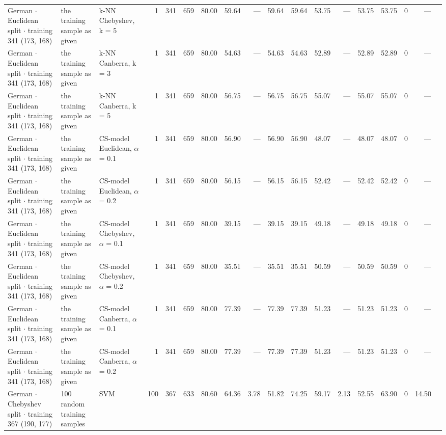 \begin{longtable}{lllrrrrrrrrrrrrrrl}
  German $\cdot$ Euclidean split $\cdot$ training 341 (173, 168) & the training sample as given & k-NN Chebyshev, k = 5 & 1 & 341 & 659 & 80.00 & 59.64 & --- & 59.64 & 59.64 & 53.75 & --- & 53.75 & 53.75 & 0 & --- &  \\
  German $\cdot$ Euclidean split $\cdot$ training 341 (173, 168) & the training sample as given & k-NN Canberra, k = 3 & 1 & 341 & 659 & 80.00 & 54.63 & --- & 54.63 & 54.63 & 52.89 & --- & 52.89 & 52.89 & 0 & --- &  \\
  German $\cdot$ Euclidean split $\cdot$ training 341 (173, 168) & the training sample as given & k-NN Canberra, k = 5 & 1 & 341 & 659 & 80.00 & 56.75 & --- & 56.75 & 56.75 & 55.07 & --- & 55.07 & 55.07 & 0 & --- &  \\
  German $\cdot$ Euclidean split $\cdot$ training 341 (173, 168) & the training sample as given & CS-model Euclidean, $\alpha$ = 0.1 & 1 & 341 & 659 & 80.00 & 56.90 & --- & 56.90 & 56.90 & 48.07 & --- & 48.07 & 48.07 & 0 & --- &  \\
  German $\cdot$ Euclidean split $\cdot$ training 341 (173, 168) & the training sample as given & CS-model Euclidean, $\alpha$ = 0.2 & 1 & 341 & 659 & 80.00 & 56.15 & --- & 56.15 & 56.15 & 52.42 & --- & 52.42 & 52.42 & 0 & --- &  \\
  German $\cdot$ Euclidean split $\cdot$ training 341 (173, 168) & the training sample as given & CS-model Chebyshev, $\alpha$ = 0.1 & 1 & 341 & 659 & 80.00 & 39.15 & --- & 39.15 & 39.15 & 49.18 & --- & 49.18 & 49.18 & 0 & --- &  \\
  German $\cdot$ Euclidean split $\cdot$ training 341 (173, 168) & the training sample as given & CS-model Chebyshev, $\alpha$ = 0.2 & 1 & 341 & 659 & 80.00 & 35.51 & --- & 35.51 & 35.51 & 50.59 & --- & 50.59 & 50.59 & 0 & --- &  \\
  German $\cdot$ Euclidean split $\cdot$ training 341 (173, 168) & the training sample as given & CS-model Canberra, $\alpha$ = 0.1 & 1 & 341 & 659 & 80.00 & 77.39 & --- & 77.39 & 77.39 & 51.23 & --- & 51.23 & 51.23 & 0 & --- &  \\
  German $\cdot$ Euclidean split $\cdot$ training 341 (173, 168) & the training sample as given & CS-model Canberra, $\alpha$ = 0.2 & 1 & 341 & 659 & 80.00 & 77.39 & --- & 77.39 & 77.39 & 51.23 & --- & 51.23 & 51.23 & 0 & --- &  \\
  German $\cdot$ Chebyshev split $\cdot$ training 367 (190, 177) & 100 random training samples & SVM & 100 & 367 & 633 & 80.60 & 64.36 & 3.78 & 51.82 & 74.25 & 59.17 & 2.13 & 52.55 & 63.90 & 0 & 14.50 &  \\

\end{longtable}
